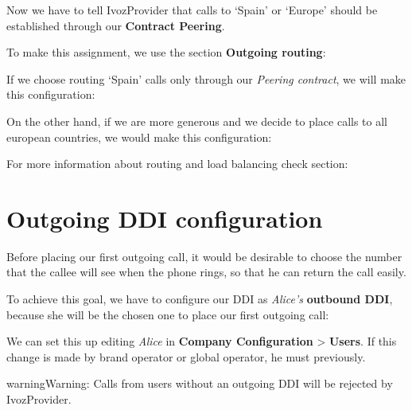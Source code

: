 \documentclass[letterpaper,10pt,english]{sphinxmanual}
\begin{document}
Now we have to tell IvozProvider that calls to `Spain' or `Europe' should be
established through our \textbf{Contract Peering}.

To make this assignment, we use the section \textbf{Outgoing routing}:

If we choose routing `Spain' calls only through our \emph{Peering contract}, we will
make this configuration:


On the other hand, if we are more generous and we decide to place calls to all
european countries, we would make this configuration:


For more information about routing and load balancing check {\hyperref[brand/routing/outgoing_routing:outgoing\string-routing]{}} section:


\section{Outgoing DDI configuration}
\label{getting_started/external_outgoing_calls/outgoing_ddi:external-ddi}\label{getting_started/external_outgoing_calls/outgoing_ddi::doc}\label{getting_started/external_outgoing_calls/outgoing_ddi:outgoing-ddi-configuration}
Before placing our first outgoing call, it would be desirable to choose the
number that the callee will see when the phone rings, so that he can return the
call easily.

To achieve this goal, we have to configure our DDI as \emph{Alice's} \textbf{outbound DDI},
because she will be the chosen one to place our first outgoing call:

\noindent{}

We can set this up editing \emph{Alice} in \textbf{Company Configuration} \textgreater{} \textbf{Users}. If
this change is made by brand operator or global operator, he must {\hyperref[getting_started/internal_calls/brand_portal:emulate\string-company]{}} previously.

\begin{notice}{warning}{Warning:}
Calls from users without an outgoing DDI will be rejected by IvozProvider.
\end{notice}
\end{document}
